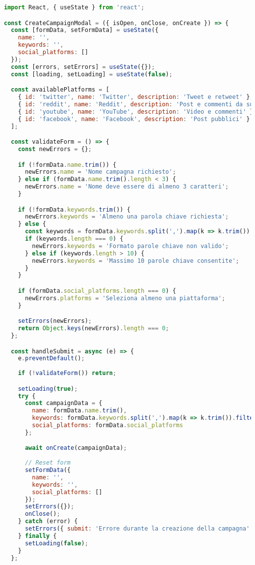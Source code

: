 \documentclass[12pt,a4paper]{report}
\begin{document}
\begin{lstlisting}[language=JavaScript, caption=CreateCampaignModal.jsx]
import React, { useState } from 'react';

const CreateCampaignModal = ({ isOpen, onClose, onCreate }) => {
  const [formData, setFormData] = useState({
    name: '',
    keywords: '',
    social_platforms: []
  });
  const [errors, setErrors] = useState({});
  const [loading, setLoading] = useState(false);

  const availablePlatforms = [
    { id: 'twitter', name: 'Twitter', description: 'Tweet e retweet' },
    { id: 'reddit', name: 'Reddit', description: 'Post e commenti da subreddit' },
    { id: 'youtube', name: 'YouTube', description: 'Video e commenti' },
    { id: 'facebook', name: 'Facebook', description: 'Post pubblici' }
  ];

  const validateForm = () => {
    const newErrors = {};

    if (!formData.name.trim()) {
      newErrors.name = 'Nome campagna richiesto';
    } else if (formData.name.trim().length < 3) {
      newErrors.name = 'Nome deve essere di almeno 3 caratteri';
    }

    if (!formData.keywords.trim()) {
      newErrors.keywords = 'Almeno una parola chiave richiesta';
    } else {
      const keywords = formData.keywords.split(',').map(k => k.trim()).filter(k => k);
      if (keywords.length === 0) {
        newErrors.keywords = 'Formato parole chiave non valido';
      } else if (keywords.length > 10) {
        newErrors.keywords = 'Massimo 10 parole chiave consentite';
      }
    }

    if (formData.social_platforms.length === 0) {
      newErrors.platforms = 'Seleziona almeno una piattaforma';
    }

    setErrors(newErrors);
    return Object.keys(newErrors).length === 0;
  };

  const handleSubmit = async (e) => {
    e.preventDefault();
    
    if (!validateForm()) return;

    setLoading(true);
    try {
      const campaignData = {
        name: formData.name.trim(),
        keywords: formData.keywords.split(',').map(k => k.trim()).filter(k => k),
        social_platforms: formData.social_platforms
      };

      await onCreate(campaignData);
      
      // Reset form
      setFormData({
        name: '',
        keywords: '',
        social_platforms: []
      });
      setErrors({});
      onClose();
    } catch (error) {
      setErrors({ submit: 'Errore durante la creazione della campagna' });
    } finally {
      setLoading(false);
    }
  };


\end{lstlisting}
\end{document}
